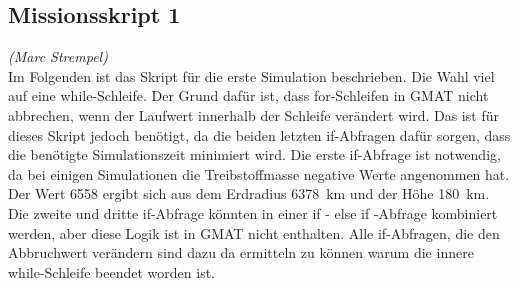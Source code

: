 
\subsection{Missionsskript 1}
\hfill\emph{(Marc Strempel)}\\
Im Folgenden ist das Skript für die erste Simulation beschrieben. Die Wahl viel auf eine while-Schleife. Der Grund dafür ist, dass for-Schleifen in GMAT nicht abbrechen, wenn der Laufwert innerhalb der Schleife verändert wird.
Das ist für dieses Skript jedoch benötigt, da die beiden letzten if-Abfragen dafür sorgen, dass die benötigte Simulationszeit minimiert wird.
Die erste if-Abfrage ist notwendig, da bei einigen Simulationen die Treibstoffmasse negative Werte angenommen hat. Der Wert \num{6558} ergibt sich aus dem Erdradius \SI{6378}{\km} und der Höhe \SI{180}{\km}. Die zweite und dritte if-Abfrage könnten in einer if - else if -Abfrage kombiniert werden, aber diese Logik ist in GMAT nicht enthalten.
Alle if-Abfragen, die den Abbruchwert verändern sind dazu da ermitteln zu können warum die innere while-Schleife beendet worden ist.\\


